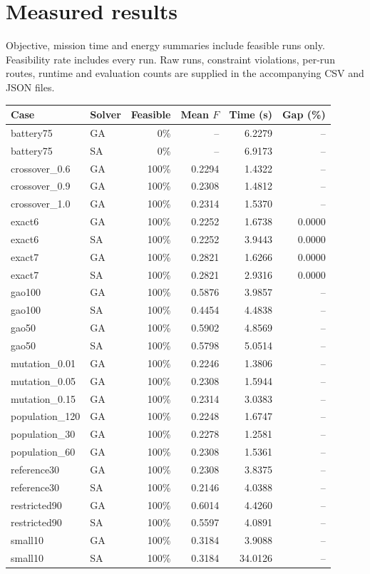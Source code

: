 \section{Measured results}
Objective, mission time and energy summaries include feasible runs only. Feasibility rate includes every run. Raw runs, constraint violations, per-run routes, runtime and evaluation counts are supplied in the accompanying CSV and JSON files.
\begin{small}\begin{longtable}{llrrrr}
Case & Solver & Feasible & Mean $F$ & Time (s) & Gap (\%) \\ \hline
battery75 & GA & 0\% & -- & 6.2279 & -- \\
battery75 & SA & 0\% & -- & 6.9173 & -- \\
crossover\_0.6 & GA & 100\% & 0.2294 & 1.4322 & -- \\
crossover\_0.9 & GA & 100\% & 0.2308 & 1.4812 & -- \\
crossover\_1.0 & GA & 100\% & 0.2314 & 1.5370 & -- \\
exact6 & GA & 100\% & 0.2252 & 1.6738 & 0.0000 \\
exact6 & SA & 100\% & 0.2252 & 3.9443 & 0.0000 \\
exact7 & GA & 100\% & 0.2821 & 1.6266 & 0.0000 \\
exact7 & SA & 100\% & 0.2821 & 2.9316 & 0.0000 \\
gao100 & GA & 100\% & 0.5876 & 3.9857 & -- \\
gao100 & SA & 100\% & 0.4454 & 4.4838 & -- \\
gao50 & GA & 100\% & 0.5902 & 4.8569 & -- \\
gao50 & SA & 100\% & 0.5798 & 5.0514 & -- \\
mutation\_0.01 & GA & 100\% & 0.2246 & 1.3806 & -- \\
mutation\_0.05 & GA & 100\% & 0.2308 & 1.5944 & -- \\
mutation\_0.15 & GA & 100\% & 0.2314 & 3.0383 & -- \\
population\_120 & GA & 100\% & 0.2248 & 1.6747 & -- \\
population\_30 & GA & 100\% & 0.2278 & 1.2581 & -- \\
population\_60 & GA & 100\% & 0.2308 & 1.5361 & -- \\
reference30 & GA & 100\% & 0.2308 & 3.8375 & -- \\
reference30 & SA & 100\% & 0.2146 & 4.0388 & -- \\
restricted90 & GA & 100\% & 0.6014 & 4.4260 & -- \\
restricted90 & SA & 100\% & 0.5597 & 4.0891 & -- \\
small10 & GA & 100\% & 0.3184 & 3.9088 & -- \\
small10 & SA & 100\% & 0.3184 & 34.0126 & -- \\
\end{longtable}\end{small}
